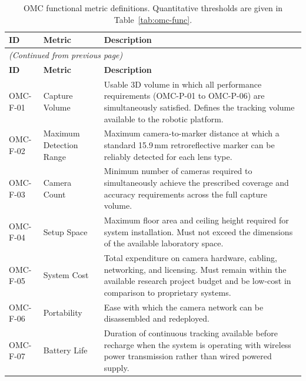 {\small\setlength{\tabcolsep}{4pt}
\begin{longtable}{p{1.5cm} >{\raggedright\arraybackslash}p{3.0cm} >{\raggedright\arraybackslash}p{\dimexpr\linewidth-1.5cm-3.0cm-6\tabcolsep\relax}}
\caption[OMC functional metric definitions.]{OMC functional metric definitions. Quantitative thresholds are given in Table~\ref{tab:omc-func}.}
\label{tab:omc-func-desc}\\
\toprule
\textbf{ID} & \textbf{Metric} & \textbf{Description} \\
\midrule
\endfirsthead
\multicolumn{3}{l}{\small\textit{(Continued from previous page)}}\\[2pt]
\toprule
\textbf{ID} & \textbf{Metric} & \textbf{Description} \\
\midrule
\endhead
\bottomrule
\endlastfoot
OMC-F-01 & Capture Volume & Usable 3D volume in which all performance requirements (OMC-P-01 to OMC-P-06) are simultaneously satisfied. Defines the tracking volume available to the robotic platform. \\[4pt]
OMC-F-02 & Maximum Detection Range & Maximum camera-to-marker distance at which a standard 15.9\,mm retroreflective marker can be reliably detected for each lens type. \\[4pt]
OMC-F-03 & Camera Count & Minimum number of cameras required to simultaneously achieve the prescribed coverage and accuracy requirements across the full capture volume. \\[4pt]
OMC-F-04 & Setup Space & Maximum floor area and ceiling height required for system installation. Must not exceed the dimensions of the available laboratory space. \\[4pt]
OMC-F-05 & System Cost & Total expenditure on camera hardware, cabling, networking, and licensing. Must remain within the available research project budget and be low-cost in comparison to proprietary systems. \\[4pt]
OMC-F-06 & Portability & Ease with which the camera network can be disassembled and redeployed. \\[4pt]
OMC-F-07 & Battery Life & Duration of continuous tracking available before recharge when the system is operating with wireless power transmission rather than wired powered supply. \\
\end{longtable}}

